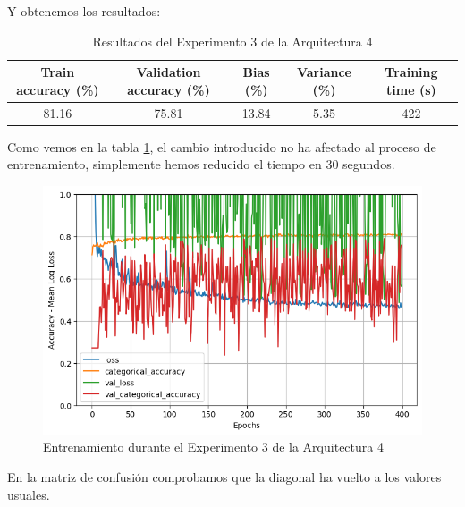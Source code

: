 \documentclass{article}
\begin{document}
			Y obtenemos los resultados:
			\begin{table}[!h]
				\begin{center}
					\begin{tabular}{| c | c | c | c | c |}
						\textbf{Train accuracy (\%)} & \textbf{Validation accuracy (\%)} & \textbf{Bias (\%)} & \textbf{Variance (\%)} & \textbf{Training time (s)} \\ \hline
						81.16 & 75.81 & 13.84 & 5.35 & 422 \\ \hline
					\end{tabular}
					\caption{Resultados del Experimento 3 de la Arquitectura 4}
					\label{tab:res-d-a4-e3}
				\end{center}
			\end{table}
			
			Como vemos en la tabla \ref{tab:res-d-a4-e3}, el cambio introducido no ha afectado al proceso de entrenamiento, simplemente hemos reducido el tiempo en 30 segundos.
			\begin{figure}[!h]
				\begin{center}
					\includegraphics[scale=0.4]{d-tr-a4-e3.png}		
					\caption{Entrenamiento durante el Experimento 3 de la Arquitectura 4}	
					\label{d-tr-a4-e3}
				\end{center}
			\end{figure}
			\newpage
			En la matriz de confusi\'on comprobamos que la diagonal ha vuelto a los valores usuales.
\end{document}
